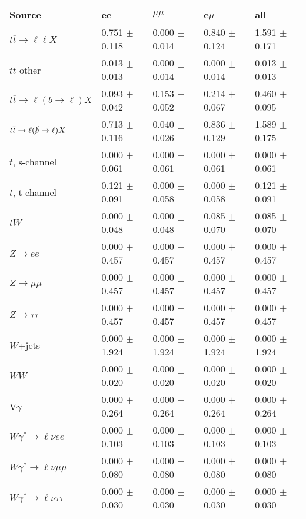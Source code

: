 \begin{tabular}{l | l l l l}
\hline\hline
 Source  &  ee  &  $\mu\mu$  &  e$\mu$  &  all \\
\hline
$t\overline{t}\rightarrow \ell\ell X$ &  0.751 $\pm$  0.118 &  0.000 $\pm$  0.014 &  0.840 $\pm$  0.124 &  1.591 $\pm$  0.171\\
$t\overline{t}$ other &  0.013 $\pm$  0.013 &  0.000 $\pm$  0.014 &  0.000 $\pm$  0.014 &  0.013 $\pm$  0.013\\
$t\overline{t}\rightarrow \ell(b\rightarrow \ell)X$ &  0.093 $\pm$  0.042 &  0.153 $\pm$  0.052 &  0.214 $\pm$  0.067 &  0.460 $\pm$  0.095\\
$t\overline{t}\rightarrow \ell(\slashed{b}\rightarrow \ell)X$ &  0.713 $\pm$  0.116 &  0.040 $\pm$  0.026 &  0.836 $\pm$  0.129 &  1.589 $\pm$  0.175\\
\hline
$t$, s-channel &  0.000 $\pm$  0.061 &  0.000 $\pm$  0.061 &  0.000 $\pm$  0.061 &  0.000 $\pm$  0.061\\
$t$, t-channel &  0.121 $\pm$  0.091 &  0.000 $\pm$  0.058 &  0.000 $\pm$  0.058 &  0.121 $\pm$  0.091\\
$tW$ &  0.000 $\pm$  0.048 &  0.000 $\pm$  0.048 &  0.085 $\pm$  0.070 &  0.085 $\pm$  0.070\\
\hline
$Z\rightarrow ee$ &  0.000 $\pm$  0.457 &  0.000 $\pm$  0.457 &  0.000 $\pm$  0.457 &  0.000 $\pm$  0.457\\
$Z\rightarrow\mu\mu$ &  0.000 $\pm$  0.457 &  0.000 $\pm$  0.457 &  0.000 $\pm$  0.457 &  0.000 $\pm$  0.457\\
$Z\rightarrow\tau\tau$ &  0.000 $\pm$  0.457 &  0.000 $\pm$  0.457 &  0.000 $\pm$  0.457 &  0.000 $\pm$  0.457\\
$W$+jets &  0.000 $\pm$  1.924 &  0.000 $\pm$  1.924 &  0.000 $\pm$  1.924 &  0.000 $\pm$  1.924\\
$WW$ &  0.000 $\pm$  0.020 &  0.000 $\pm$  0.020 &  0.000 $\pm$  0.020 &  0.000 $\pm$  0.020\\
\hline
V$\gamma$ &  0.000 $\pm$  0.264 &  0.000 $\pm$  0.264 &  0.000 $\pm$  0.264 &  0.000 $\pm$  0.264\\
$W\gamma^{*}\rightarrow\ell\nu e e$ &  0.000 $\pm$  0.103 &  0.000 $\pm$  0.103 &  0.000 $\pm$  0.103 &  0.000 $\pm$  0.103\\
$W\gamma^{*}\rightarrow\ell\nu\mu\mu$ &  0.000 $\pm$  0.080 &  0.000 $\pm$  0.080 &  0.000 $\pm$  0.080 &  0.000 $\pm$  0.080\\
$W\gamma^{*}\rightarrow\ell\nu\tau\tau$ &  0.000 $\pm$  0.030 &  0.000 $\pm$  0.030 &  0.000 $\pm$  0.030 &  0.000 $\pm$  0.030\\

\end{tabular}
